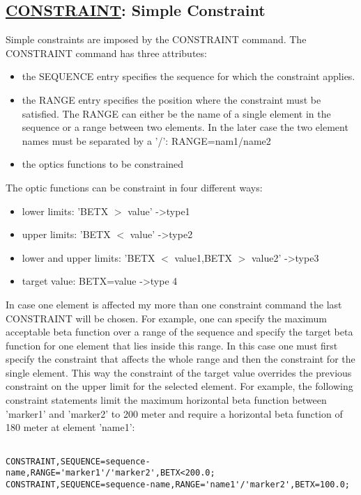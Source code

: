 \subsection{\href{constraint}{CONSTRAINT}: Simple Constraint} Simple constraints are imposed by the CONSTRAINT command. The CONSTRAINT command has three attributes:  
\begin{itemize}
	\item  the SEQUENCE entry specifies the sequence for which the constraint applies. 
	\item  the RANGE entry specifies the position where the constraint must be satisfied. The RANGE can either be the name of a single element in the sequence or a range between two elements. In the later case the two element names must be separated by a '/': RANGE=nam1/name2 
	\item the optics functions to be constrained 
\end{itemize}  The optic functions can be constraint in four different ways: 
\begin{itemize}
	\item lower limits: 'BETX $>$ value' -\textgreater type1 
	\item upper limits: 'BETX $<$ value' -\textgreater type2 
	\item lower and upper limits: 'BETX $<$ value1,BETX $>$ value2' -\textgreater type3 
	\item target value: BETX=value -\textgreater type 4 
\end{itemize} In case one element is affected my more than one constraint command the last  CONSTRAINT will be chosen. For example, one can specify the maximum acceptable beta function over a range of the sequence and specify the target beta  function for one element that lies inside this range. In this case one must first specify the constraint that affects the whole range and then the constraint for the single element. This way the constraint of the target value overrides the previous constraint on the upper limit for the selected element. For example, the following constraint statements limit the maximum horizontal beta function between 'marker1' and 'marker2' to 200 meter and require a horizontal beta function of 180 meter at element 'name1': 
\begin{verbatim}

CONSTRAINT,SEQUENCE=sequence-name,RANGE='marker1'/'marker2',BETX<200.0;
CONSTRAINT,SEQUENCE=sequence-name,RANGE='name1'/'marker2',BETX=100.0;
\end{verbatim}

